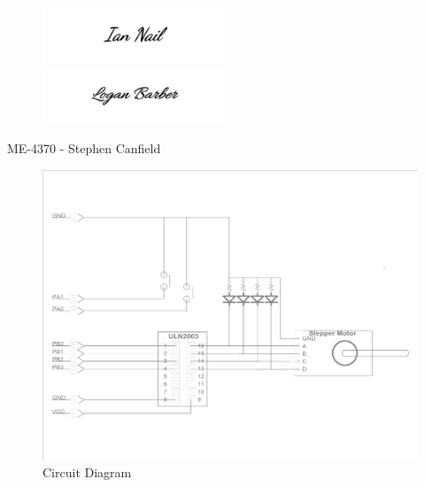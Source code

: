 \documentclass[a4paper,12pt]{article} %
\begin{document}
\maketitle %
\vspace{3cm}

\begin{figure}[h!]
\centering
    \includegraphics[width=0.5\textwidth]{IANsignature.png}
    \includegraphics[width=0.5\textwidth]{LOGANsignature.png}
  \end{figure}
\begin{center}
\vspace{3cm}
ME-4370 - Stephen Canfield
\end{center}
\pagebreak



\begin{figure}[h!]
  \center
  \includegraphics[width=\textwidth]{AutoCAD.pdf}
  \caption{Circuit Diagram}
  \label{fig:circuitDiagram}
\end{figure}
\end{document}
